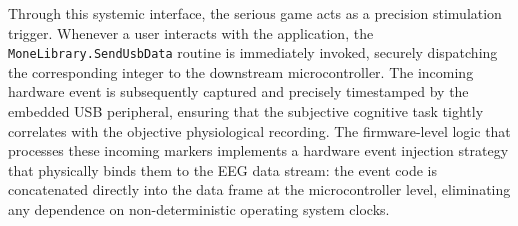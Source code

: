 Through this systemic interface, the serious game acts as a precision stimulation trigger. Whenever a user interacts with the application, the \texttt{MoneLibrary.SendUsbData} routine is immediately invoked, securely dispatching the corresponding integer to the downstream microcontroller. The incoming hardware event is subsequently captured and precisely timestamped by the embedded USB peripheral, ensuring that the subjective cognitive task tightly correlates with the objective physiological recording. The firmware-level logic that processes these incoming markers implements a hardware event injection strategy that physically binds them to the EEG data stream: the event code is concatenated directly into the data frame at the microcontroller level, eliminating any dependence on non-deterministic operating system clocks.

